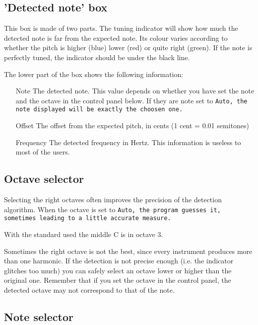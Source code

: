 \subsection{'Detected note' box}\label{detectednote}

This box is made of two parts. The tuning indicator will show
how much the detected note is far from the expected note. Its
colour varies according to whether the pitch is higher (blue)
lower (red) or quite right (green). If the note is perfectly
tuned, the indicator should be under the black line.

The lower part of the box shows the following information:
\begin{itemize}
\item[Note] The detected note. This value depends on whether you
have set the note and the octave in the control panel below. If
they are note set to \tt{Auto}, the note displayed will be exactly
the choosen one.
\item[Offset] The offset from the expected pitch, in cents (1 cent = 
0.01 semitones)
\item[Frequency] The detected frequency in Hertz. This information is
useless to most of the users.
\end{itemize}

\subsection{Octave selector}\label{octave}

Selecting the right octaves often improves the precision of the
detection algorithm. When the octave is set to \tt{Auto}, the program
guesses it, sometimes leading to a little accurate measure.

With the standard used the middle C is in octave 3.

Sometimes the right octave is not the best, since every instrument
produces more than one harmonic. If the detection is not precise
enough (i.e. the indicator glitches too much) you can safely select
an octave lower or higher than the original one.
Remember that if you set the octave in the control panel, the detected
octave may not correspond to that of the note.

\subsection{Note selector}\label{note}

